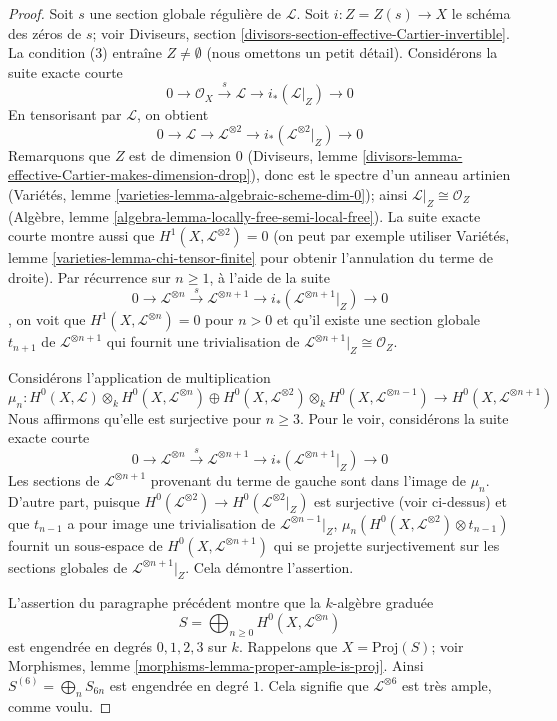 \begin{proof}
Soit $s$ une section globale régulière de $\mathcal{L}$. Soit $i : Z = Z(s) \to X$ le schéma des zéros de $s$; voir Diviseurs, section \ref{divisors-section-effective-Cartier-invertible}. La condition (3) entraîne $Z \not = \emptyset$ (nous omettons un petit détail). Considérons la suite exacte courte $$
0 \to \mathcal{O}_X \xrightarrow{s} \mathcal{L} \to
i_*(\mathcal{L}|_Z) \to 0
$$ En tensorisant par $\mathcal{L}$, on obtient $$
0 \to \mathcal{L} \to \mathcal{L}^{\otimes 2} \to
i_*(\mathcal{L}^{\otimes 2}|_Z) \to 0
$$ Remarquons que $Z$ est de dimension $0$ (Diviseurs, lemme \ref{divisors-lemma-effective-Cartier-makes-dimension-drop}), donc est le spectre d'un anneau artinien (Variétés, lemme \ref{varieties-lemma-algebraic-scheme-dim-0}); ainsi $\mathcal{L}|_Z \cong \mathcal{O}_Z$ (Algèbre, lemme \ref{algebra-lemma-locally-free-semi-local-free}). La suite exacte courte montre aussi que $H^1(X, \mathcal{L}^{\otimes 2}) = 0$ (on peut par exemple utiliser Variétés, lemme \ref{varieties-lemma-chi-tensor-finite} pour obtenir l'annulation du terme de droite). Par récurrence sur $n \geq 1$, à l'aide de la suite $$
0 \to \mathcal{L}^{\otimes n} \xrightarrow{s}
\mathcal{L}^{\otimes n + 1} \to
i_*(\mathcal{L}^{\otimes n + 1}|_Z) \to 0
$$, on voit que $H^1(X, \mathcal{L}^{\otimes n}) = 0$ pour $n > 0$ et qu'il existe une section globale $t_{n + 1}$ de $\mathcal{L}^{\otimes n + 1}$ qui fournit une trivialisation de $\mathcal{L}^{\otimes n + 1}|_Z \cong \mathcal{O}_Z$.

\medskip\noindent
Considérons l'application de multiplication $$
\mu_n :
H^0(X, \mathcal{L}) \otimes_k H^0(X, \mathcal{L}^{\otimes n})
\oplus
H^0(X, \mathcal{L}^{\otimes 2}) \otimes_k H^0(X, \mathcal{L}^{\otimes n - 1})
\longrightarrow
H^0(X, \mathcal{L}^{\otimes n + 1})
$$ Nous affirmons qu'elle est surjective pour $n \geq 3$. Pour le voir, considérons la suite exacte courte $$
0 \to \mathcal{L}^{\otimes n} \xrightarrow{s}
\mathcal{L}^{\otimes n + 1} \to i_*(\mathcal{L}^{\otimes n + 1}|_Z) \to 0
$$ Les sections de $\mathcal{L}^{\otimes n + 1}$ provenant du terme de gauche sont dans l'image de $\mu_n$. D'autre part, puisque $H^0(\mathcal{L}^{\otimes 2}) \to H^0(\mathcal{L}^{\otimes 2}|_Z)$ est surjective (voir ci-dessus) et que $t_{n - 1}$ a pour image une trivialisation de $\mathcal{L}^{\otimes n - 1}|_Z$, $\mu_n(H^0(X, \mathcal{L}^{\otimes 2}) \otimes t_{n - 1})$ fournit un sous-espace de $H^0(X, \mathcal{L}^{\otimes n + 1})$ qui se projette surjectivement sur les sections globales de $\mathcal{L}^{\otimes n + 1}|_Z$. Cela démontre l'assertion.

\medskip\noindent
L'assertion du paragraphe précédent montre que la $k$-algèbre graduée $$
S = \bigoplus\nolimits_{n \geq 0} H^0(X, \mathcal{L}^{\otimes n})
$$ est engendrée en degrés $0, 1, 2, 3$ sur $k$. Rappelons que $X = \text{Proj}(S)$; voir Morphismes, lemme \ref{morphisms-lemma-proper-ample-is-proj}. Ainsi $S^{(6)} = \bigoplus_{n} S_{6n}$ est engendrée en degré $1$. Cela signifie que $\mathcal{L}^{\otimes 6}$ est très ample, comme voulu.
\end{proof}

